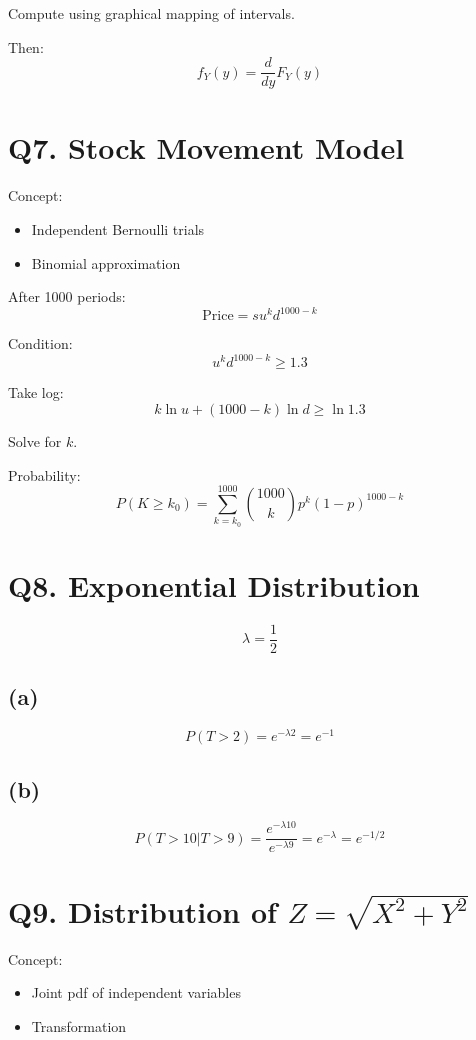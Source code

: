 \documentclass[11pt]{article}
\begin{document}
Compute using graphical mapping of intervals.

Then:
\[
f_Y(y)=\frac{d}{dy}F_Y(y)
\]

\section*{Q7. Stock Movement Model}

Concept:
\begin{itemize}
\item Independent Bernoulli trials
\item Binomial approximation
\end{itemize}

After 1000 periods:
\[
\text{Price}=s u^k d^{1000-k}
\]

Condition:
\[
u^k d^{1000-k} \ge 1.3
\]

Take log:
\[
k\ln u + (1000-k)\ln d \ge \ln 1.3
\]

Solve for $k$.

Probability:
\[
P(K\ge k_0)
=
\sum_{k=k_0}^{1000}
\binom{1000}{k}p^k(1-p)^{1000-k}
\]

\section*{Q8. Exponential Distribution}

\[
\lambda=\frac{1}{2}
\]

\subsection*{(a)}

\[
P(T>2)=e^{-\lambda 2}
=
e^{-1}
\]

\subsection*{(b)}

\[
P(T>10|T>9)
=
\frac{e^{-\lambda 10}}{e^{-\lambda 9}}
=
e^{-\lambda}
=
e^{-1/2}
\]

\section*{Q9. Distribution of $Z=\sqrt{X^2+Y^2}$}

Concept:
\begin{itemize}
\item Joint pdf of independent variables
\item Transformation
\end{itemize}
\end{document}
